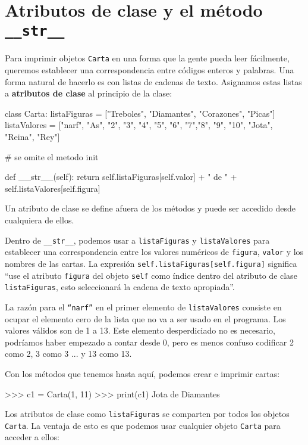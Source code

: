 \section{Atributos de clase y el método \texttt{\_\_str\_\_}}

 

Para imprimir objetos \texttt{Carta} en una forma que la gente pueda
leer fácilmente, queremos establecer una correspondencia entre códigos
enteros y palabras. Una forma natural de hacerlo es con listas de
cadenas de texto. Asignamos estas listas a \textbf{atributos de clase}
al principio de la clase:
\begin{pythoncode}
class Carta:
  listaFiguras = ["Treboles", "Diamantes", "Corazones", 
  "Picas"]
  listaValores = ["narf", "As", "2", "3", "4", "5", "6", 
  "7","8", "9", "10", "Jota", "Reina", "Rey"]

  # se omite el metodo init

  def __str__(self):
    return self.listaFiguras[self.valor] + " de " + 
            self.listaValores[self.figura]
\end{pythoncode}

Un atributo de clase se define afuera de los métodos y puede ser accedido
desde cualquiera de ellos.

Dentro de \texttt{\_\_str\_\_}, podemos usar a \texttt{listaFiguras}
y \texttt{listaValores} para establecer una correspondencia entre
los valores numéricos de \texttt{figura}, \texttt{valor} y los nombres
de las cartas. La expresión \verb+self.listaFiguras[self.figura]+
significa ``use el atributo \texttt{figura} del objeto \texttt{self}
como índice dentro del atributo de clase \texttt{listaFiguras}, esto
seleccionará la cadena de texto apropiada''.

La razón para el \texttt{``narf''} en el primer elemento de \texttt{listaValores}
consiste en ocupar el elemento cero de la lista que no va a ser usado
en el programa. Los valores válidos son de 1 a 13. Este elemento desperdiciado
no es necesario, podríamos haber empezado a contar desde 0, pero es
menos confuso codificar 2 como 2, 3 como 3 ... y 13 como 13.

Con los métodos que tenemos hasta aquí, podemos crear e imprimir cartas:
\begin{pyconcode}
>>> c1 = Carta(1, 11)
>>> print(c1)
Jota de Diamantes
\end{pyconcode}
 Los atributos de clase como \texttt{listaFiguras} se comparten por
todos los objetos \texttt{Carta}. La ventaja de esto es que podemos
usar cualquier objeto \texttt{Carta} para acceder a ellos:

